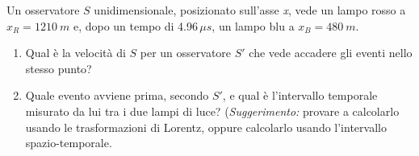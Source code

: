 
\begin{Exercise}[title={Applicazione delle trasformazioni di Lorentz}]
  Un osservatore $S$ unidimensionale, posizionato sull'asse \textit{x}, vede un lampo rosso a $x_R=\SI{1210}{m}$ e,
  dopo un tempo di 4.96\,$\mu s$, un lampo blu a $x_B=\SI{480}{m}$.
  \begin{enumerate}
    \item Qual \`e la velocit\`a di $S$ per un osservatore $S'$ che vede accadere gli eventi nello stesso punto?
    \item Quale evento avviene prima, secondo $S'$, e qual \`e
      l'intervallo temporale misurato da lui tra i due lampi di luce?
      (\textit{Suggerimento:} provare a calcolarlo usando le
      trasformazioni di Lorentz, oppure calcolarlo usando l'intervallo
      spazio-temporale.
  \end{enumerate}
\end{Exercise}
